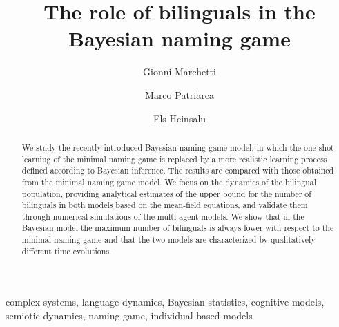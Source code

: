 \documentclass[review]{elsarticle}
\newcommand{\+}{\! + \!}
\begin{document}

\begin{frontmatter}

\title{The role of bilinguals in the {B}ayesian naming game}



\author{Gionni Marchetti}
%
\author{Marco Patriarca}
%
\author{Els Heinsalu}
%
\address{National Institute of Chemical Physics and Biophysics, R\"avala 10, 10143 Tallinn, Estonia}




\begin{abstract}
We study the recently introduced Bayesian naming game model, in which the one-shot learning of the minimal naming game is replaced by a more realistic learning process defined according to Bayesian inference.
The results are compared with those obtained from the minimal naming game model.
We focus on the dynamics of the bilingual population, providing analytical estimates of the upper bound for the number of bilinguals in both models based on the mean-field equations, and validate them through numerical simulations of the multi-agent models.
We show that in the Bayesian model the maximum number of bilinguals is always lower with respect to the minimal naming game and that the two models are characterized by qualitatively different time evolutions.
\end{abstract}


\begin{keyword}
complex systems, language dynamics, {B}ayesian statistics, cognitive models, semiotic dynamics, naming game, individual-based models
\end{keyword}

\end{frontmatter}
\end{document}
